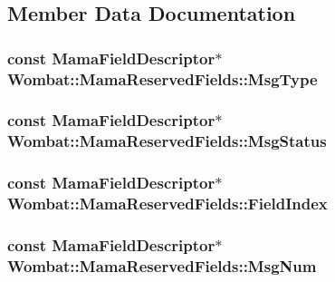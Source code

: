 \subsection{Member Data Documentation}
\hypertarget{classWombat_1_1MamaReservedFields_a0819e9809452d6e67b71b12e3a6b1e04}{
\subsubsection[{MsgType}]{\setlength{\rightskip}{0pt plus 5cm}const {\bf MamaFieldDescriptor}$\ast$ {\bf Wombat::MamaReservedFields::MsgType}}}
\label{classWombat_1_1MamaReservedFields_a0819e9809452d6e67b71b12e3a6b1e04}
\hypertarget{classWombat_1_1MamaReservedFields_ac3d37bfc45c2ea9786476c37781571ab}{
\subsubsection[{MsgStatus}]{\setlength{\rightskip}{0pt plus 5cm}const {\bf MamaFieldDescriptor}$\ast$ {\bf Wombat::MamaReservedFields::MsgStatus}}}
\label{classWombat_1_1MamaReservedFields_ac3d37bfc45c2ea9786476c37781571ab}
\hypertarget{classWombat_1_1MamaReservedFields_acf0bd2fbf45d1792d39fbc2479fdec3c}{
\subsubsection[{FieldIndex}]{\setlength{\rightskip}{0pt plus 5cm}const {\bf MamaFieldDescriptor}$\ast$ {\bf Wombat::MamaReservedFields::FieldIndex}}}
\label{classWombat_1_1MamaReservedFields_acf0bd2fbf45d1792d39fbc2479fdec3c}
\hypertarget{classWombat_1_1MamaReservedFields_aeb9b392a9e079c24bc8bab62a7bfbe29}{
\subsubsection[{MsgNum}]{\setlength{\rightskip}{0pt plus 5cm}const {\bf MamaFieldDescriptor}$\ast$ {\bf Wombat::MamaReservedFields::MsgNum}}}
